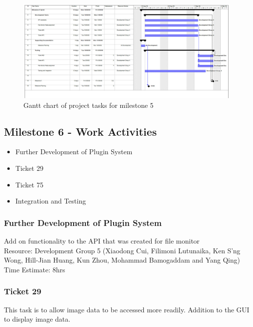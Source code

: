 \documentclass{article}
\begin{document}
\begin{figure}[htp]
\begin{centering}
\includegraphics[angle=90,scale=0.5]{./schedule-milestone5.jpg} 
\par\end{centering}
\caption{Gantt chart of project tasks for milestone 5}
\label{fig:schedule5} 
\end{figure}

\newpage{}

\subsection{Milestone 6 - Work Activities}

\begin{itemize}
\item Further Development of Plugin System
\item Ticket 29
\item Ticket 75
\item Integration and Testing
\end{itemize}

\subsubsection{Further Development of Plugin System}
	Add on functionality to the API that was created for file monitor\\
	
	Resource: Development Group 5 (Xiaodong Cui, Filimoni Lutunaika, Ken S'ng Wong, Hill-Jian Huang, Kun Zhou, Mohammad Bamogaddam and Yang Qing)
	Time Estimate: 8hrs

\subsubsection{Ticket 29}
	This task is to allow image data to be accessed more readily. Addition to the GUI to display image data.
	
\end{document}
